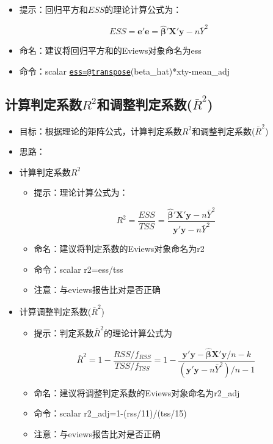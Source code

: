 \documentclass[12pt,(landscape,a4paper),(portrait,a4paper)]{article}
\providecommand{\tightlist}{%
  \setlength{\itemsep}{0pt}\setlength{\parskip}{0pt}}
\begin{document}
\begin{itemize}
  \begin{itemize}
  \tightlist
  \item
    提示：回归平方和\(ESS\)的理论计算公式为：
  \end{itemize}

  \[ESS=\mathbf{e'e}=\mathbf{\hat{\beta}'X'y}-n\bar{Y}^2\]

  \begin{itemize}
  \item
    命名：建议将回归平方和的Eviews对象命名为ess
  \item
    命令：scalar
    \href{mailto:ess=@transpose}{\nolinkurl{ess=@transpose}}(beta\_hat)*xty-mean\_adj
  \end{itemize}
\end{itemize}

\hypertarget{r2barr2}{%
\subsection{\texorpdfstring{计算判定系数\(R^2\)和调整判定系数(\(\bar{R}^2\))}{计算判定系数R\^{}2和调整判定系数(\textbackslash{}bar\{R\}\^{}2)}}\label{r2barr2}}

\begin{itemize}
\tightlist
\item
  目标：根据理论的矩阵公式，计算判定系数\(R^2\)和调整判定系数(\(\bar{R}^2\))
\item
  思路：
\item
  计算判定系数\(R^2\)

  \begin{itemize}
  \tightlist
  \item
    提示：理论计算公式为：
  \end{itemize}

  \[R^2=\frac{ESS}{TSS}=\frac{\mathbf{\hat{\beta}'X'y}-n\bar{Y}^2}{\mathbf{y'y}-n\bar{Y}^2}\]

  \begin{itemize}
  \tightlist
  \item
    命名：建议将判定系数的Eviews对象命名为r2
  \item
    命令：scalar r2=ess/tss
  \item
    注意：与eviews报告比对是否正确
  \end{itemize}
\item
  计算调整判定系数(\(\bar{R}^2\))

  \begin{itemize}
  \tightlist
  \item
    提示：判定系数\(\bar{R}^2\)的理论计算公式为
  \end{itemize}

  \[\bar{R}^2=1-\frac{RSS/{f_{RSS}}}{TSS/{f_{TSS}}}=1-\frac{\mathbf{y'y-\hat{\beta}X'y}/{n-k}}{{(\mathbf{y'y}-n\bar{Y}^2)}/{n-1}}\]

  \begin{itemize}
  \tightlist
  \item
    命名：建议将调整判定系数的Eviews对象命名为r2\_adj
  \item
    命令：scalar r2\_adj=1-(rss/11)/(tss/15)
  \item
    注意：与eviews报告比对是否正确
  \end{itemize}
\end{itemize}
\end{document}
